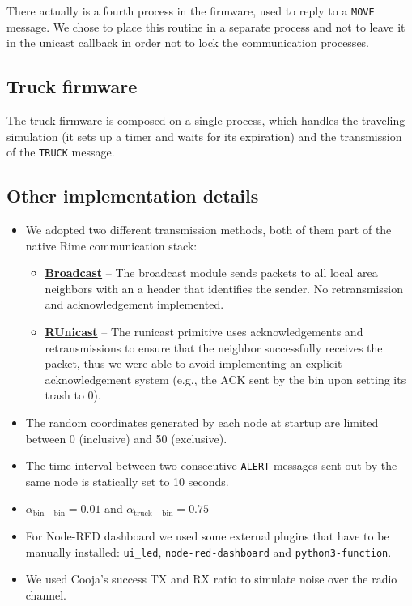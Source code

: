 \documentclass[a4paper, 11pt, parskip=half]{scrartcl}
\begin{document}
There actually is a fourth process in the firmware, used to reply to a \texttt{MOVE} message. We chose to place this routine in a separate process and not to leave it in the unicast callback in order not to lock the communication processes.

\subsection{Truck firmware}

The truck firmware is composed on a single process, which handles the traveling simulation (it sets up a timer and waits for its expiration) and the transmission of the \texttt{TRUCK} message.

\subsection{Other implementation details}

\begin{itemize}
	\item We adopted two different transmission methods, both of them part of the native Rime communication stack:
		\begin{itemize}
			\item \href{http://contiki.sourceforge.net/docs/2.6/a01720.html}{\textbf{Broadcast}} -- The broadcast module sends packets to all local area neighbors with an a header that identifies the sender. No retransmission and acknowledgement implemented.
			\item \href{http://contiki.sourceforge.net/docs/2.6/a01738.html}{\textbf{RUnicast}} -- The runicast primitive uses acknowledgements and retransmissions to ensure that the neighbor successfully receives the packet, thus we were able to avoid implementing an explicit acknowledgement system (e.g., the ACK sent by the bin upon setting its trash to 0).
		\end{itemize}
	\item The random coordinates generated by each node at startup are limited between 0 (inclusive) and 50 (exclusive).
	\item The time interval between two consecutive \texttt{ALERT} messages sent out by the same node is statically set to 10 seconds.
	\item $\alpha_\mathrm{bin-bin} = 0.01$ and $\alpha_\mathrm{truck-bin} = 0.75$
	\item For Node-RED dashboard we used some external plugins that have to be manually installed: \texttt{ui\_led}, \texttt{node-red-dashboard} and \texttt{python3-function}.
	\item We used Cooja's success TX and RX ratio to simulate noise over the radio channel.
\end{itemize}
\end{document}
